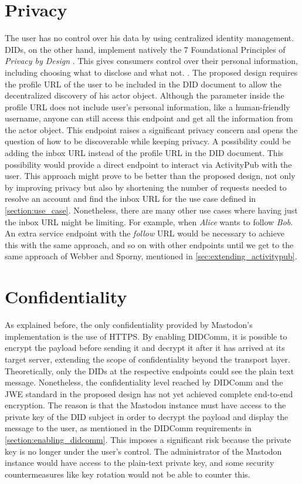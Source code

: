 \section{Privacy}
The user has no control over his data by using centralized identity management. DIDs, on the other hand,  implement natively the 7 Foundational Principles of \emph{Privacy by Design} \cite{cavoukian_2006}. This gives consumers control over their personal information, including choosing what to disclose and what not. \cite{sporny_longley_sabadello_reed_steele_2021}. The proposed design requires the profile URL of the user to be included in the DID document to allow the decentralized discovery of his actor object. Although the parameter inside the profile URL does not include user's personal information, like a human-friendly username, anyone can still access this endpoint and get all the information from the actor object. This endpoint raises a significant privacy concern and opens the question of how to be discoverable while keeping privacy. A possibility could be adding the inbox URL instead of the profile URL in the DID document. This possibility would provide a direct endpoint to interact via ActivityPub with the user. This approach might prove to be better than the proposed design, not only by improving privacy but also by shortening the number of requests needed to resolve an account and find the inbox URL for the use case defined in \autoref{section:use_case}. Nonetheless, there are many other use cases where having just the inbox URL might be limiting. For example, when \emph{Alice} wants to follow \emph{Bob}. An extra service endpoint with the \emph{follow} URL would be necessary to achieve this with the same approach, and so on with other endpoints until we get to the same approach of Webber and Sporny, mentioned in \autoref{sec:extending_activitypub}. 


\section{Confidentiality}
As explained before, the only confidentiality provided by Mastodon's implementation is the use of HTTPS. By enabling DIDComm, it is possible to encrypt the payload before sending it and decrypt it after it has arrived at its target server, extending the scope of confidentiality beyond the transport layer. Theoretically, only the DIDs at the respective endpoints could see the plain text message. 
Nonetheless, the confidentiality level reached by DIDComm and the JWE standard in the proposed design has not yet achieved complete end-to-end encryption. The reason is that the Mastodon instance must have access to the private key of the DID subject in order to decrypt the payload and display the message to the user, as mentioned in the DIDComm requirements in \autoref{section:enabling_didcomm}. This imposes a significant risk because the private key is no longer under the user's control. The administrator of the Mastodon instance would have access to the plain-text private key, and some security countermeasures like key rotation would not be able to counter this. 



